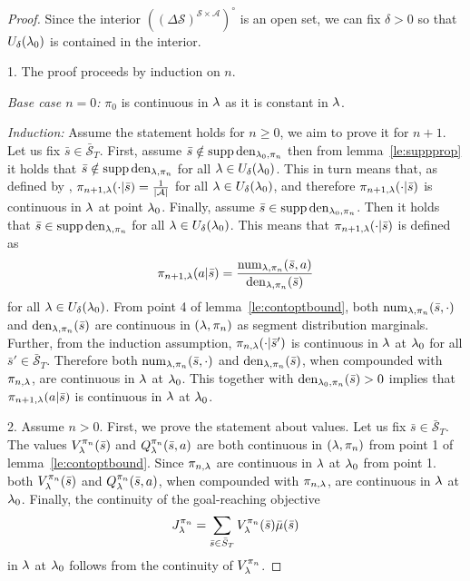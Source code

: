 \begin{proof}
Since the interior $((\Delta \mathcal{S})^{\mathcal{S}\times\mathcal{A}})^{\circ}$ is an open set, we can fix $\delta >0$
so that $U_{\delta}(\mathit{\lambda}_0)$ is contained in the interior.

1.
The proof proceeds by induction on $n$.

\emph{Base case $n=0$:}
$\pi_0$ is continuous in $\mathit{\lambda}$ as it is constant in $\mathit{\lambda}$.

\emph{Induction:} Assume the statement holds for $n\geq0$, we aim to prove it for $n+1$.
Let us fix $\bar{s} \in \bar{\mathcal{S}}_T$.
First, assume $\bar{s} \notin \operatorname*{\mathrm{supp}} \mathrm{den}_{\mathit{\lambda}_0,\pi_n}$ then from lemma~\ref{le:suppprop} it holds that
$\bar{s} \notin \operatorname*{\mathrm{supp}} \mathrm{den}_{\mathit{\lambda},\pi_n}$ for all 
$\mathit{\lambda}\in U_{\delta}(\mathit{\lambda}_0)$.
This in turn means that, as defined by , $\pi_{n+1,\mathit{\lambda}}(\cdot|\bar{s})=\frac{1}{|\mathcal{A}|}$ for all $\mathit{\lambda}\in U_{\delta}(\mathit{\lambda}_0)$, and therefore
$\pi_{n+1,\mathit{\lambda}}(\cdot|\bar{s})$ is continuous in $\mathit{\lambda}$ at point $\mathit{\lambda}_0$.
Finally, assume $\bar{s}\in\operatorname*{\mathrm{supp}} \mathrm{den}_{\mathit{\lambda}_0,\pi_n}$.
Then it holds that $\bar{s}\in\operatorname*{\mathrm{supp}} \mathrm{den}_{\mathit{\lambda},\pi_n}$ for all $\mathit{\lambda}\in U_{\delta}(\mathit{\lambda}_0)$.
This means that $\pi_{n+1,\mathit{\lambda}}(\cdot|\bar{s})$ is defined as
$$
\pi_{n+1,\mathit{\lambda}}(a|\bar{s}) = \frac{\mathrm{num}_{\mathit{\lambda},\pi_n}(\bar{s},a)}
{\mathrm{den}_{\mathit{\lambda},\pi_n}(\bar{s})}
$$
for all $\mathit{\lambda} \in U_{\delta}(\mathit{\lambda}_0)$.
From point 4 of lemma~\ref{le:contoptbound}, both $\mathrm{num}_{\mathit{\lambda},\pi_n}(\bar{s},\cdot)$ and $\mathrm{den}_{\mathit{\lambda},\pi_n}(\bar{s})$ are continuous in $(\mathit{\lambda},\pi_n)$ as segment distribution marginals. Further, from the induction assumption, $\pi_{n,\mathit{\lambda}}(\cdot|\bar{s}')$ is continuous in $\mathit{\lambda}$ at $\mathit{\lambda}_0$ for all $\bar{s}' \in \bar{\mathcal{S}}_T$. Therefore both $\mathrm{num}_{\mathit{\lambda},\pi_n}(\bar{s},\cdot)$ and $\mathrm{den}_{\mathit{\lambda},\pi_n}(\bar{s})$,
when compounded with $\pi_{n,\mathit{\lambda}}$, are continuous
in $\mathit{\lambda}$ at $\mathit{\lambda}_0$.
This together with $\mathrm{den}_{\mathit{\lambda}_0,\pi_n}(\bar{s}) >0$ implies that $\pi_{n+1,\mathit{\lambda}}(a|\bar{s})$ is continuous in $\mathit{\lambda}$ at $\mathit{\lambda}_0$.


2.
Assume $n>0$. First, we prove the statement about values. Let us fix $\bar{s}\in \bar{\mathcal{S}}_T$.
The values $V_{\mathit{\lambda}}^{\pi_n}(\bar{s})$ and $Q_{\mathit{\lambda}}^{\pi_n}(\bar{s},a)$ are both continuous
in $(\mathit{\lambda},\pi_n)$ from point 1 of lemma~\ref{le:contoptbound}. Since
$\pi_{n,\mathit{\lambda}}$ are continuous in $\mathit{\lambda}$ at $\mathit{\lambda}_0$ from point 1.\, both $V_{\mathit{\lambda}}^{\pi_n}(\bar{s})$ and $Q_{\mathit{\lambda}}^{\pi_n}(\bar{s},a)$, when compounded with $\pi_{n,\mathit{\lambda}}$,
are continuous in $\mathit{\lambda}$ at $\mathit{\lambda}_0$.
Finally, the continuity of the goal-reaching objective
$$
J_{\mathit{\lambda}}^{\pi_n}
=
\sum_{\bar{s}\in \bar{S}_T}
V_{\mathit{\lambda}}^{\pi_n}(\bar{s})
\bar{\mu}(\bar{s})
$$
in $\mathit{\lambda}$ at $\mathit{\lambda}_0$
follows from the continuity of $V_{\mathit{\lambda}}^{\pi_n}$.



\end{proof}


